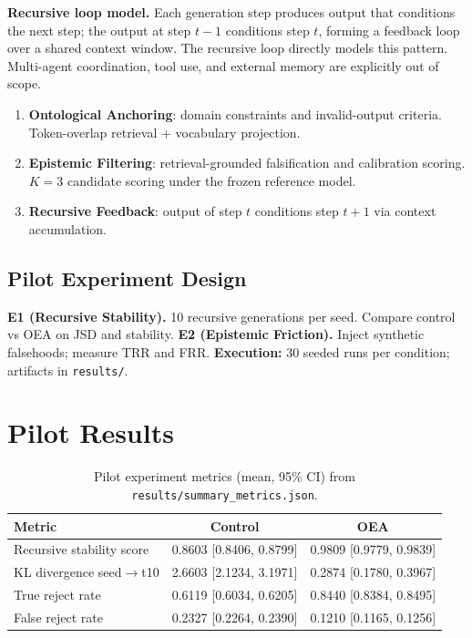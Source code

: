 \documentclass[11pt]{article}
\begin{document}
\noindent\textbf{Recursive loop model.} Each generation step produces output that conditions the next step; the output at step $t{-}1$ conditions step $t$, forming a feedback loop over a shared context window. The recursive loop directly models this pattern. Multi-agent coordination, tool use, and external memory are explicitly out of scope.

\begin{enumerate}[leftmargin=1.5em]
  \item \textbf{Ontological Anchoring}: domain constraints and invalid-output criteria. Token-overlap retrieval + vocabulary projection.
  \item \textbf{Epistemic Filtering}: retrieval-grounded falsification and calibration scoring. $K{=}3$ candidate scoring under the frozen reference model.
  \item \textbf{Recursive Feedback}: output of step $t$ conditions step $t{+}1$ via context accumulation.
\end{enumerate}

\subsection{Pilot Experiment Design}

\textbf{E1 (Recursive Stability).} 10 recursive generations per seed. Compare control vs OEA on JSD and stability.
\textbf{E2 (Epistemic Friction).} Inject synthetic falsehoods; measure TRR and FRR.
\textbf{Execution:} 30 seeded runs per condition; artifacts in \texttt{results/}.

\section{Pilot Results}
\label{sec:pilot}

\begin{table}[h]
\centering
\begin{tabular}{lcc}
\toprule
Metric & Control & OEA \\
\midrule
Recursive stability score & 0.8603 [0.8406, 0.8799] & 0.9809 [0.9779, 0.9839] \\
KL divergence seed$\rightarrow$t10 & 2.6603 [2.1234, 3.1971] & 0.2874 [0.1780, 0.3967] \\
True reject rate & 0.6119 [0.6034, 0.6205] & 0.8440 [0.8384, 0.8495] \\
False reject rate & 0.2327 [0.2264, 0.2390] & 0.1210 [0.1165, 0.1256] \\
\bottomrule
\end{tabular}
\caption{Pilot experiment metrics (mean, 95\% CI) from \texttt{results/summary\_metrics.json}.}
\label{tab:pilot-results}
\end{table}
\end{document}
